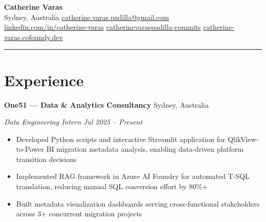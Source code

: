 \documentclass[11pt,letterpaper]{article}
\newcommand{\entry}[4]{%
  \noindent\textbf{#1} \hfill #2 \par\nopagebreak
  \textit{#3} \hfill \textit{#4} \par\nopagebreak
}
\begin{document}
\begin{center}
  {\LARGE\bfseries Catherine Varas} \\[4pt]
  \enspace Sydney, Australia
  \quad{}\enspace \href{mailto:catherine.varas.padilla@gmail.com}{catherine.varas.padilla@gmail.com}
  \\[2pt]
  \enspace \href{https://www.linkedin.com/in/catherine-varas/}{linkedin.com/in/catherine-varas}
  \quad{}\enspace \href{https://github.com/catherinevaraspadilla-commits/}{catherinevaraspadilla-commits}
  \quad{}\enspace \href{https://catherine-varas.cofoundy.dev}{catherine-varas.cofoundy.dev}
\end{center}

\vspace{-0.4em}
\noindent\rule{\textwidth}{0.8pt}
\vspace{-0.8em}

\section{Experience}

\entry{One51 — Data \& Analytics Consultancy}{Sydney, Australia}{Data Engineering Intern}{Jul 2025 -- Present}
\begin{itemize}
  \item Developed Python scripts and interactive Streamlit application for QlikView-to-Power BI migration metadata analysis, enabling data-driven platform transition decisions
  \item Implemented RAG framework in Azure AI Foundry for automated T-SQL translation, reducing manual SQL conversion effort by 80\%+
  \item Built metadata visualization dashboards serving cross-functional stakeholders across 3+ concurrent migration projects
\end{itemize}
\vspace{0.3em}
\end{document}
